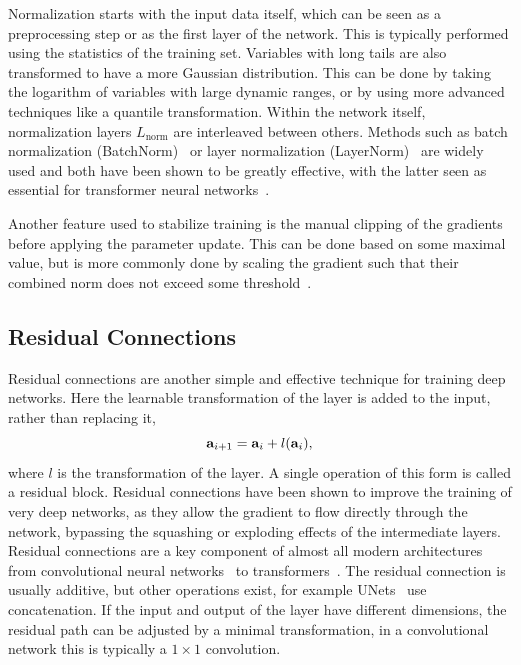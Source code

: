 Normalization starts with the input data itself, which can be seen as a preprocessing step or as the first layer of the network.
This is typically performed using the statistics of the training set.
Variables with long tails are also transformed to have a more Gaussian distribution.
This can be done by taking the logarithm of variables with large dynamic ranges, or by using more advanced techniques like a quantile transformation.
Within the network itself, normalization layers $L_{\text{norm}}$ are interleaved between others.
Methods such as batch normalization (BatchNorm)~\cite{BatchNorm} or layer normalization (LayerNorm)~\cite{LayerNorm} are widely used and both have been shown to be greatly effective, with the latter seen as essential for transformer neural networks~\cite{Attention}.

Another feature used to stabilize training is the manual clipping of the gradients before applying the parameter update.
This can be done based on some maximal value, but is more commonly done by scaling the gradient such that their combined norm does not exceed some threshold~\cite{WhyGradientClipping}.

\subsection{Residual Connections}

Residual connections are another simple and effective technique for training deep networks.
Here the learnable transformation of the layer is added to the input, rather than replacing it,
\begin{equation}
    \mathbf{a}_{i+1} = \mathbf{a}_i + l(\mathbf{a}_i),
\end{equation}
where $l$ is the transformation of the layer.
A single operation of this form is called a residual block.
Residual connections have been shown to improve the training of very deep networks, as they allow the gradient to flow directly through the network, bypassing the squashing or exploding effects of the intermediate layers.
Residual connections are a key component of almost all modern architectures from convolutional neural networks~\cite{ResNet} to transformers~\cite{Attention}.
The residual connection is usually additive, but other operations exist, for example UNets~\cite{Unet} use concatenation.
If the input and output of the layer have different dimensions, the residual path can be adjusted by a minimal transformation, in a convolutional network this is typically a $1 \times 1$ convolution.

